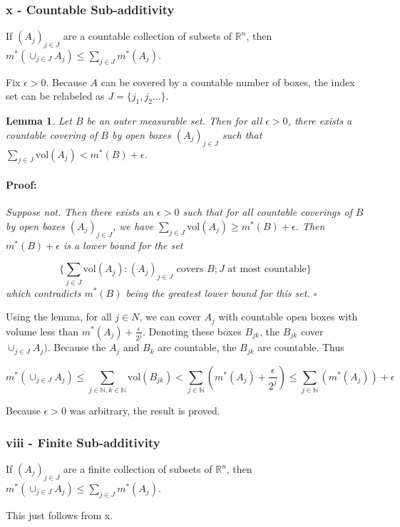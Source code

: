 \documentclass{article}
\newenvironment{proof}{\paragraph{Proof:}}{\hfill$\square$}
\newtheorem{lemma}[theorem]{Lemma}
\newcommand{\R}{\mathbb{R}}
\newcommand{\N}{\mathbb{N}}
\newcommand{\vol}{\text{vol}}
\begin{document}
\subsubsection*{x - Countable Sub-additivity}

If $(A_j)_{j \in J}$ are a countable collection of subsets of $\R^n$, then $m^*(\cup_{j \in J} A_j) \leq \sum_{j \in J} m^*(A_j)$.

Fix $\epsilon > 0$. Because $A$ can be covered by a countable number of boxes, the index set can be relabeled as $J = \{j_1, j_2 \dots \}$.

\begin{lemma}
Let $B$ be an outer measurable set. Then for all $\epsilon > 0$, there exists a countable covering of $B$ by open boxes $(A_j)_{j \in J}$ such that $\sum_{j \in J} \vol(A_j) < m^*(B) + \epsilon$.
\begin{proof}
Suppose not. Then there exists an $\epsilon > 0$ such that for all countable coverings of $B$ by open boxes $(A_j)_{j \in J}$, we have $\sum_{j \in J} \vol(A_j) \geq m^*(B) + \epsilon$. Then $m^*(B) + \epsilon$ is a lower bound for the set 

\[
\{\sum_{j \in J} \vol(A_j): (A_j)_{j \in J} \text{ covers } B; J \text { at most countable}\}
\]
which contradicts $m^*(B)$ being the greatest lower bound for this set.
\end{proof}  
\end{lemma}

Using the lemma, for all $j \in N$, we can cover $A_j$ with countable open boxes with volume less than $m^*(A_j) + \frac{\epsilon}{2^j}$. Denoting these boxes $B_{jk}$, the $B_{jk}$ cover $\cup_{j \in J} A_j)$. Because the $A_j$ and $B_k$ are countable, the $B_{jk}$ are countable. Thus

\[
m^*(\cup_{j \in J} A_j) \leq \sum_{j \in \N, k \in \N} \vol(B_{jk})
< \sum_{j \in \N} (m^*(A_j) + \frac{\epsilon}{2^j}) \leq \sum_{j \in \N} (m^*(A_j)) + \epsilon
\]

Because $\epsilon > 0$ was arbitrary, the result is proved.

\subsubsection*{viii - Finite Sub-additivity}

If $(A_j)_{j \in J}$ are a finite collection of subsets of $\R^n$, then $m^*(\cup_{j \in J} A_j) \leq \sum_{j \in J} m^*(A_j)$.

This just follows from x.
\end{document}
